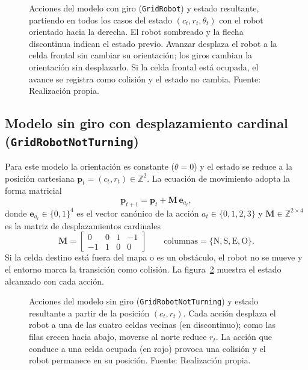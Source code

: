 \begin{figure}[htbp]
    \centering
    
    \caption[Acciones del modelo con giro]{Acciones del modelo con giro
    (\texttt{GridRobot}) y estado resultante, partiendo en todos los casos
    del estado $(c_t, r_t, \theta_t)$ con el robot orientado hacia la
    derecha. El robot sombreado y la flecha discontinua indican el estado
    previo. Avanzar desplaza el robot a la celda frontal sin cambiar su
    orientación; los giros cambian la orientación sin desplazarlo. Si la
    celda frontal está ocupada, el avance se registra como colisión y el
    estado no cambia. Fuente: Realización propia.}
    \label{fig:cinematica_con_giro}
\end{figure}

\subsection{Modelo sin giro con desplazamiento cardinal (\texttt{GridRobotNotTurning})}
Para este modelo la orientación es constante ($\theta = 0$) y el estado se
reduce a la posición cartesiana $\mathbf{p}_t = (c_t, r_t)\in\mathbb{Z}^2$.
La ecuación de movimiento adopta la forma matricial
\begin{equation}
    \mathbf{p}_{t+1} = \mathbf{p}_t + \mathbf{M}\, \mathbf{e}_{a_t},
\end{equation}
donde $\mathbf{e}_{a_t}\in\{0,1\}^4$ es el vector canónico de la acción
$a_t\in\{0,1,2,3\}$ y $\mathbf{M}\in\mathbb{Z}^{2\times 4}$ es la matriz
de desplazamientos cardinales
\begin{equation}
    \mathbf{M} =
    \begin{bmatrix}
         0 &  0 &  1 & -1 \\
        -1 &  1 &  0 &  0
    \end{bmatrix}
    \qquad \text{columnas} = \{\text{N}, \text{S}, \text{E}, \text{O}\}.
\end{equation}
Si la celda destino está fuera del mapa o es un obstáculo, el robot no se
mueve y el entorno marca la transición como colisión. La
figura~\ref{fig:cinematica_sin_giro} muestra el estado alcanzado con cada
acción.

\begin{figure}[htbp]
    \centering
    
    \caption[Acciones del modelo sin giro]{Acciones del modelo sin giro
    (\texttt{GridRobotNotTurning}) y estado resultante a partir de la
    posición $(c_t, r_t)$. Cada acción desplaza el robot a una de las
    cuatro celdas vecinas (en discontinuo); como las filas crecen hacia
    abajo, moverse al norte reduce $r_t$. La acción que conduce a una celda
    ocupada (en rojo) provoca una colisión y el robot permanece en su
    posición. Fuente: Realización propia.}
    \label{fig:cinematica_sin_giro}
\end{figure}


